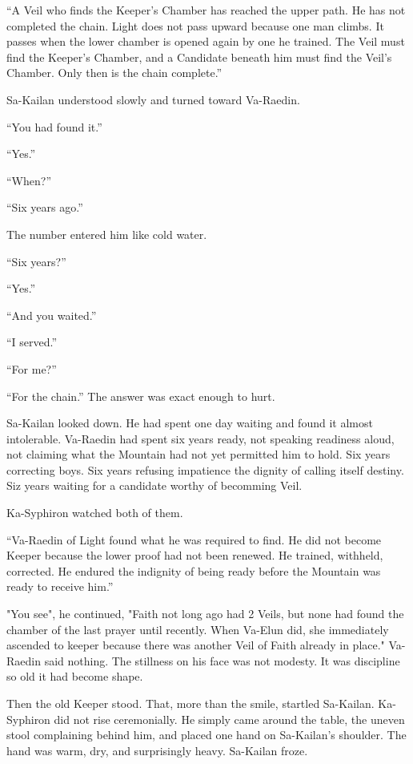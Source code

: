 “A Veil who finds the Keeper’s Chamber has reached the upper path. He has not completed the chain. Light does not pass upward because one man climbs. 
It passes when the lower chamber is opened again by one he trained. The Veil must find the Keeper’s Chamber, and a Candidate beneath him must find the Veil’s Chamber. Only then is the chain complete.”\par
Sa-Kailan understood slowly and turned toward Va-Raedin.\par
“You had found it.”\par
“Yes.”\par
“When?”\par
“Six years ago.”\par
The number entered him like cold water.\par
“Six years?”\par
“Yes.”\par
“And you waited.”\par
“I served.”\par
“For me?”\par
“For the chain.” The answer was exact enough to hurt.\par

Sa-Kailan looked down. 
He had spent one day waiting and found it almost intolerable. 
Va-Raedin had spent six years ready, not speaking readiness aloud, not claiming what the Mountain had not yet permitted him to hold. 
Six years correcting boys. Six years refusing impatience the dignity of calling itself destiny.
Siz years waiting for a candidate worthy of becomming Veil.\par


Ka-Syphiron watched both of them.\par
“Va-Raedin of Light found what he was required to find. 
He did not become Keeper because the lower proof had not been renewed. He trained, withheld, corrected. 
He endured the indignity of being ready before the Mountain was ready to receive him.”\par
"You see", he continued, "Faith not long ago had 2 Veils, but none had found the chamber of the last prayer until recently. 
When Va-Elun did, she immediately ascended to keeper because there was another Veil of Faith already in place."
Va-Raedin said nothing. The stillness on his face was not modesty. It was discipline so old it had become shape. 


Then the old Keeper stood.
That, more than the smile, startled Sa-Kailan. Ka-Syphiron did not rise ceremonially. 
He simply came around the table, the uneven stool complaining behind him, and placed one hand on Sa-Kailan’s shoulder.
The hand was warm, dry, and surprisingly heavy. Sa-Kailan froze.\par


